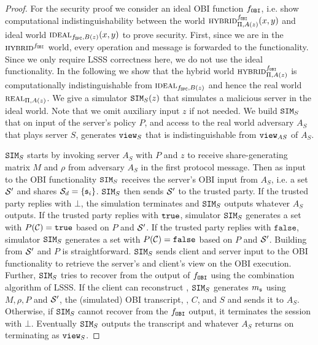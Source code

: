 \begin{proof}
For the security proof we consider an ideal OBI function $f_\mathtt{OBI}$, i.e. show computational indistinguishability between the world $\HYBRID^{f_\OBI}_{\Pi, A(z)} (x, y)$ and ideal world $\IDEAL_{f_\SPC, B(z)}(x, y)$ to prove security. First, since we are in the $\HYBRID^{f_\OBI}$ world, every \OBI operation and message is forwarded to the \OBI functionality.
Since we only require LSSS correctness here, we do not use the ideal functionality.
In the following we show that the hybrid world $\HYBRID^{f_\OBI}_{\Pi, A(z)}$ is computationally indistinguishable from $\IDEAL_{f_\SPC, B(z)}$ and hence the real world $\REAL_{\Pi, A(z)}$. We give a simulator $\mathtt{SIM}_S(z)$ that simulates a malicious server in the ideal world. %
Note that we omit auxiliary input $z$ if not needed. We build $\mathtt{SIM}_S$ that on input of the server's policy $P$, and access to the real world adversary $A_S$ that plays server $S$, generates $\mathtt{view}_S$ that is indistinguishable from $\mathtt{view}_{AS}$ of $A_S$.

$\mathtt{SIM}_S$ starts by invoking server $A_S$ with $P$ and $z$ to receive share-generating matrix $M$ and $\rho$ from adversary $A_S$ in the first protocol message. Then as input to the OBI functionality $\mathtt{SIM}_S$ receives the server's OBI input  from $A_S$, i.e. a set $\mathcal{S}'$ and shares $\mathcal{S}_d=\{\mathfrak{s}_i\}$. $\mathtt{SIM}_S$ then sends $\mathcal{S}'$ to the trusted party. If the trusted party replies with $\bot$, the simulation terminates and $\mathtt{SIM}_S$ outputs whatever $A_S$ outputs. If the trusted party replies with $\mathtt{true}$, 
simulator $\mathtt{SIM}_S$ generates a set \cC with $P(\mathcal{C})=\mathtt{true}$ based on $P$ and $\mathcal{S}'$. If the trusted party replies with $\texttt{false}$, simulator $\mathtt{SIM}_S$ generates a set \cC with $P(\mathcal{C})=\texttt{false}$ based on $P$ and $\mathcal{S}'$. Building \cC from $\mathcal{S}'$ and $P$ is straightforward. $\mathtt{SIM}_S$ sends client and server input to the OBI functionality to retrieve the server's and client's view on the OBI execution. Further, $\mathtt{SIM}_S$ tries to recover \secret from the output of $f_\mathtt{OBI}$ using the combination algorithm of LSSS. If the client can reconstruct \secret, $\mathtt{SIM}_S$ generates $m_\mathfrak{s}$ using $M, \rho, P$ and $\mathcal{S}'$, the (simulated) OBI transcript, \secret, $C$, and $S$ and sends it to $A_S$. 
Otherwise, if $\mathtt{SIM}_S$ cannot recover \secret from the $f_\mathtt{OBI}$ output, it terminates the session with $\bot$.
Eventually $\mathtt{SIM}_S$ outputs the transcript and whatever $A_S$ returns on terminating as $\mathtt{view}_S$.


\end{proof}
